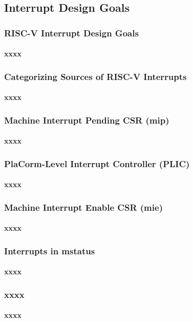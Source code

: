 \subsection{Interrupt Design Goals} 
\begin{frame}
	\frametitle{RISC-V Interrupt Design Goals}
	\framesubtitle{xxxx}
\end{frame}
% 
\begin{frame}
	\frametitle{Categorizing Sources of RISC-V Interrupts}
	\framesubtitle{xxxx}
\end{frame}
% 
\begin{frame}
	\frametitle{Machine Interrupt Pending CSR (mip)}
	\framesubtitle{xxxx}
\end{frame}
\begin{frame}
	\frametitle{PlaCorm-Level Interrupt Controller (PLIC)}
	\framesubtitle{xxxx}
\end{frame}
\begin{frame}
	\frametitle{Machine Interrupt Enable CSR (mie)}
	\framesubtitle{xxxx}
\end{frame}
\begin{frame}
	\frametitle{Interrupts in mstatus}
	\framesubtitle{xxxx}
\end{frame}
\begin{frame}
	\frametitle{xxxx}
	\framesubtitle{xxxx}
\end{frame}

